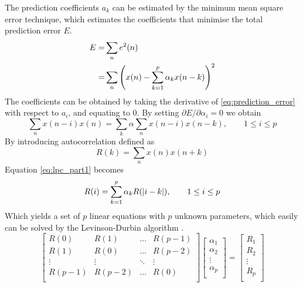 The prediction coefficients $a_k$ can be estimated by the minimum mean square error technique, which estimates the coefficients that minimise the total prediction error $E$.
\begin{equation}
	\label{eq:prediction_error}
	\begin{split}
		E = & \sum_{n} e^2(n)\\
		= & \sum_{n}\left(x(n)-\sum_{k=1}^{p}\alpha_k x(n-k)\right)^2
	\end{split}
\end{equation}
The coefficients can be obtained by taking the derivative of \eqref{eq:prediction_error} with respect to $a_i$, and equating to 0. By setting $\partial E/\partial \alpha_i = 0$ we obtain
\begin{equation}
	\sum_{n}x(n-i)x(n) = \sum_{k}\alpha \sum_{n}x(n-i)x(n-k), \qquad  1\leq i\leq p 
	\label{eq:lpc_part1}
\end{equation}	
By introducing autocorrelation defined as
\begin{equation}
	R(k) = \sum_{n} x(n) x(n+k)
\end{equation}
Equation \eqref{eq:lpc_part1} becomes
\begin{equation}
	R(i) = \sum_{k=1}^{p} \alpha_k R(\lvert i-k\rvert), \qquad  1\leq i\leq p
	\label{eq:lpc_part2}
\end{equation}
Which yields a set of $p$ linear equations with $p$ unknown parameters, which easily can be solved by \eg the Levinson-Durbin algorithm \cite{digsig,cybenko80}.
\begin{equation}
	\begin{bmatrix}
		R(0) & R(1) & \dots & R(p-1) \\
		R(1) & R(0) & \dots & R(p-2) \\
		\vdots & \vdots & \ddots & \vdots \\
		R(p-1) & R(p-2) & \dots & R(0) \\
	\end{bmatrix} 
	\begin{bmatrix}
		\alpha_1 \\
		\alpha_2 \\
		\vdots \\
		\alpha_p \\
	\end{bmatrix}
	=
	\begin{bmatrix}
		R_1 \\
		R_2 \\
		\vdots \\
		R_p \\
	\end{bmatrix}
	\label{eq:yule_walker}
\end{equation}

